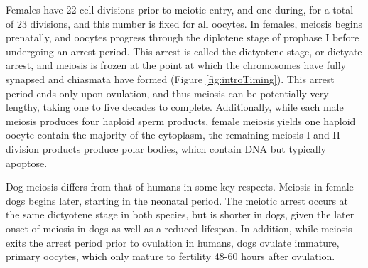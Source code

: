 Females have 22 cell divisions prior to meiotic entry, and one during, for a total of 23 divisions\cite{Crow2000a}, and this number is fixed for all oocytes.
In females, meiosis begins prenatally, and oocytes progress through the diplotene stage of prophase I before undergoing an arrest period\cite{Hassold2001,Crow2000a}.
This arrest is called the dictyotene stage, or dictyate arrest, and meiosis is frozen at the point at which the chromosomes have fully synapsed and chiasmata have formed (Figure \ref{fig:introTiming}).
This arrest period ends only upon ovulation, and thus meiosis can be potentially very lengthy, taking one to five decades to complete.
Additionally, while each male meiosis produces four haploid sperm products, female meiosis yields one haploid oocyte contain the majority of the cytoplasm, the remaining meiosis I and II division products produce polar bodies, which contain DNA but typically apoptose\cite{Schmerler2011}.


Dog meiosis differs from that of humans in some key respects.
Meiosis in female dogs begins later, starting in the neonatal period\cite{Freixa1987}.
The meiotic arrest occurs at the same dictyotene stage in both species, but is shorter in dogs, given the later onset of meiosis in dogs as well as a reduced lifespan.
In addition, while meiosis exits the arrest period prior to ovulation in humans, dogs ovulate immature, primary oocytes, which only mature to fertility 48-60 hours after ovulation\cite{Tsutsui1989,Chastant-Maillard2011}.


